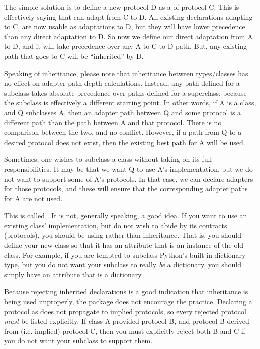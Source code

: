 \begin{verbatim%
}
\begin{verbatim%
}
\begin{verbatim%
}
\begin{verbatim%
}
The simple solution is to define a new protocol D as a  of
protocol C.  This is effectively saying that  can
adapt from C to D. All existing declarations adapting to C, are now usable as
adaptations to D, but they will have lower precedence than any direct
adaptation to D. So now we define our direct adaptation from A to D, and it
will take precedence over any A to C to D path. But, any existing path that
goes to C will be ``inherited'' by D.

Speaking of inheritance, please note that inheritance between types/classes has
no effect on adapter path depth calculations.  Instead, any path defined for a
subclass takes absolute precedence over paths defined for a superclass, because
the subclass is effectively a different starting point.  In other words, if A
is a class, and Q subclasses A, then an adapter path between Q and some
protocol is a different path than the path between A and that protocol.  There
is no comparison between the two, and no conflict.  However, if a path from Q
to a desired protocol does not exist, then the existing best path for A will be
used.

Sometimes, one wishes to subclass a class without taking on its full
responsibilities.  It may be that we want Q to use A's implementation, but we
do not want to support some of A's protocols. In that case, we can declare
 adapters for those protocols, and these will ensure
that the corresponding adapter paths for A are not used.





This is called .  It is not,
generally speaking, a good idea.  If you want to use an existing class'
implementation, but do not wish to abide by its contracts (protocols), you
should be using  rather than inheritance.  That is, you
should define your new class so that it has an attribute that is an instance of
the old class.  For example, if you are tempted to subclass Python's built-in
dictionary type, but you do not want your subclass to really \emph{be} a
dictionary, you should simply have an attribute that is a dictionary.

Because rejecting inherited declarations is a good indication that inheritance
is being used improperly, the  package does not encourage the
practice.  Declaring a protocol as  does not
propagate to implied protocols, so every rejected protocol \emph{must} be
listed explicitly.  If class A provided protocol B, and protocol B derived
from (i.e. implied) protocol C, then you must explicitly reject both B and C
if you do not want your subclass to support them.


\end{verbatim%
}
\end{verbatim%
}
\end{verbatim%
}
\end{verbatim%
}
